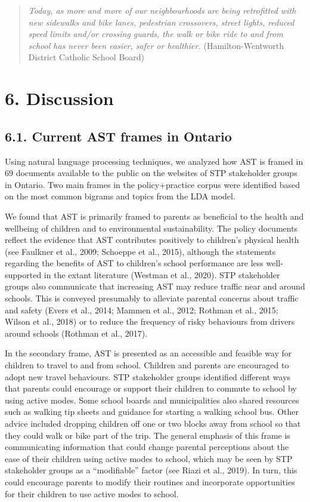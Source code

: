 \documentclass[]{elsarticle} %
\begin{document}
\begin{quote}
\emph{Today, as more and more of our neighbourhoods are being
retrofitted with new sidewalks and bike lanes, pedestrian crossovers,
street lights, reduced speed limits and/or crossing guards, the walk or
bike ride to and from school has never been easier, safer or healthier.}
(Hamilton-Wentworth District Catholic School Board)
\end{quote}

\hypertarget{discussion}{%
\section{6. Discussion}\label{discussion}}

\hypertarget{current-ast-frames-in-ontario}{%
\subsection{6.1. Current AST frames in
Ontario}\label{current-ast-frames-in-ontario}}

Using natural language processing techniques, we analyzed how AST is
framed in 69 documents available to the public on the websites of STP
stakeholder groups in Ontario. Two main frames in the policy+practice
corpus were identified based on the most common bigrams and topics from
the LDA model.

We found that AST is primarily framed to parents as beneficial to the
health and wellbeing of children and to environmental sustainability.
The policy documents reflect the evidence that AST contributes
positively to children's physical health (see Faulkner et al., 2009;
Schoeppe et al., 2015), although the statements regarding the benefits
of AST to children's school performance are less well-supported in the
extant literature (Westman et al., 2020). STP stakeholder groups also
communicate that increasing AST may reduce traffic near and around
schools. This is conveyed presumably to alleviate parental concerns
about traffic and safety (Evers et al., 2014; Mammen et al., 2012;
Rothman et al., 2015; Wilson et al., 2018) or to reduce the frequency of
risky behaviours from drivers around schools (Rothman et al., 2017).

In the secondary frame, AST is presented as an accessible and feasible
way for children to travel to and from school. Children and parents are
encouraged to adopt new travel behaviours. STP stakeholder groups
identified different ways that parents could encourage or support their
children to commute to school by using active modes. Some school boards
and municipalities also shared resources such as walking tip sheets and
guidance for starting a walking school bus. Other advice included
dropping children off one or two blocks away from school so that they
could walk or bike part of the trip. The general emphasis of this frame
is communicating information that could change parental perceptions
about the ease of their children using active modes to school, which may
be seen by STP stakeholder groups as a ``modifiable'' factor (see Riazi
et al., 2019). In turn, this could encourage parents to modify their
routines and incorporate opportunities for their children to use active
modes to school.
\end{document}
